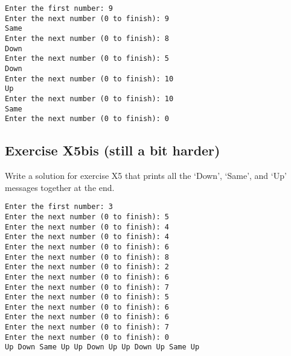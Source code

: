 \begin{verbatim}
Enter the first number: 9
Enter the next number (0 to finish): 9
Same
Enter the next number (0 to finish): 8
Down
Enter the next number (0 to finish): 5
Down
Enter the next number (0 to finish): 10
Up
Enter the next number (0 to finish): 10
Same
Enter the next number (0 to finish): 0
\end{verbatim}

\subsection*{Exercise X5bis (still a bit harder)}

Write a solution for exercise X5 that prints all the `Down',
`Same', and `Up' messages together at the end. 

\begin{verbatim}
Enter the first number: 3
Enter the next number (0 to finish): 5
Enter the next number (0 to finish): 4
Enter the next number (0 to finish): 4
Enter the next number (0 to finish): 6
Enter the next number (0 to finish): 8
Enter the next number (0 to finish): 2
Enter the next number (0 to finish): 6
Enter the next number (0 to finish): 7
Enter the next number (0 to finish): 5
Enter the next number (0 to finish): 6
Enter the next number (0 to finish): 6
Enter the next number (0 to finish): 7
Enter the next number (0 to finish): 0
Up Down Same Up Up Down Up Up Down Up Same Up 
\end{verbatim}


